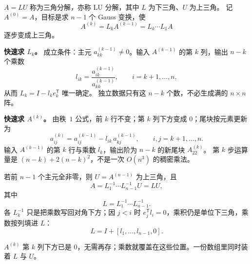 $A=LU$ 称为三角分解，亦称 LU 分解，其中 $L$ 为下三角、$U$ 为上三角。
记 $A^{(0)}=A$，目标是求 $n-1$ 个 Gauss 变换，使
\begin{equation}
A^{(k)}=L_k A^{(k-1)}=L_k\cdots L_1 A
\end{equation}
逐步变成上三角。


\textbf{快速求 $L_k$。}
成立条件：主元 $a_{kk}^{(k-1)}\neq 0$。输入 $A^{(k-1)}$ 的第 $k$ 列，输出 $n-k$ 个乘数
\begin{equation}
l_{ik}=\frac{a_{ik}^{(k-1)}}{a_{kk}^{(k-1)}},\qquad i=k+1,\ldots,n,
\end{equation}
从而 $L_k=I-l_k e_k^{\mathsf T}$ 唯一确定。
独立数据只有这 $n-k$ 个数，不必生成满的 $n\times n$ 阵。

\textbf{快速求 $A^{(k)}$。}
由秩~$1$ 公式，前 $k$ 行不变；第 $k$ 列下方变成 $0$；尾块按元素更新为
\begin{equation}
a_{ij}^{(k)}=a_{ij}^{(k-1)}-l_{ik}\,a_{kj}^{(k-1)},
\qquad i,j=k+1,\ldots,n.
\end{equation}
输入 $A^{(k-1)}$ 的第 $k$ 行与乘数 $l_k$，输出阶为 $n-k$ 的新尾块 $A_{22}^{(k)}$。
第 $k$ 步运算量是 $(n-k)+2(n-k)^2$，不是一次 $O(n^3)$ 的稠密乘法。


若前 $n-1$ 个主元全非零，则 $U=A^{(n-1)}$ 为上三角，且
\begin{equation}
A=L_1^{-1}\cdots L_{n-1}^{-1}U=LU,
\end{equation}
其中
\[
L=L_1^{-1}\cdots L_{n-1}^{-1}.
\]
各 $L_k^{-1}$ 只是把乘数写回对角下方；因 $j<i$ 时 $e_j^{\mathsf T}l_i=0$，乘积仍是单位下三角，乘数按列填进 $L$：
\begin{equation}
L=I+[l_1,\ldots,l_{n-1},0].
\end{equation}


$A^{(k)}$ 第 $k$ 列下方已是 $0$，无需再存；乘数就覆盖在这些位置。一份数组里同时装着 $L$ 与 $U$。


